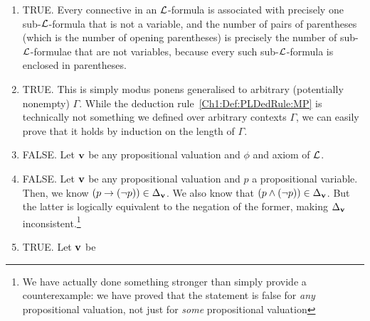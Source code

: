 \begin{solution} \hfill
    \begin{enumerate}
        \item TRUE. Every connective in an $\mathcal{L}$-formula is associated with precisely one sub-$\mathcal{L}$-formula that is not a variable, and the number of pairs of parentheses (which is the number of opening parentheses) is precisely the number of sub-$\mathcal{L}$-formulae that are not variables, because every such sub-$\mathcal{L}$-formula is enclosed in parentheses.
        
        \item TRUE. This is simply modus ponens generalised to arbitrary (potentially nonempty) $\Gamma$. While the deduction rule~\ref{Ch1:Def:PLDedRule:MP} is technically not something we defined over arbitrary contexts $\Gamma$, we can easily prove that it holds by induction on the length of $\Gamma$. 
        
        \item FALSE. Let $\mathbf{v}$ be any propositional valuation and $\phi$ and axiom of $\mathcal{L}$.
        
        \item FALSE. Let $\mathbf{v}$ be any propositional valuation and $p$ a propositional variable. Then, we know $\left( p \to \left( \neg p \right) \right) \in \Delta_{\mathbf{v}}$. We also know that $\left( p \land \left( \neg p \right) \right) \in \Delta_{\mathbf{v}}$. But the latter is logically equivalent to the negation of the former, making $\Delta_{\mathbf{v}}$ inconsistent.\footnote{We have actually done something stronger than simply provide a counterexample: we have proved that the statement is false for \textit{any} propositional valuation, not just for \textit{some} propositional valuation}
        
        \item TRUE. Let $\mathbf{v}$ be \sorry %
    \end{enumerate}
\end{solution}


